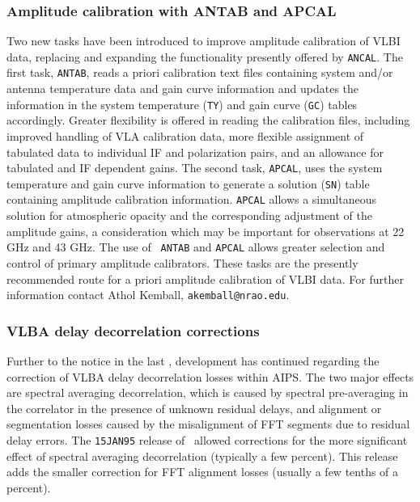 \subsubsection{Amplitude calibration with ANTAB and APCAL}

Two new tasks have been introduced to improve amplitude calibration of
VLBI data, replacing and expanding the functionality presently offered
by \hbox{{\tt ANCAL}}. The first task, {\tt ANTAB}, reads a priori
calibration text files containing system and/or antenna temperature
data and gain curve information and updates the information in the
system temperature ({\tt TY}) and gain curve ({\tt GC}) tables
accordingly.  Greater flexibility is offered in reading the
calibration files, including improved handling of VLA calibration
data, more flexible assignment of tabulated data to individual IF and
polarization pairs, and an allowance for tabulated and IF dependent
gains. The second task, {\tt APCAL}, uses the system temperature and
gain curve information to generate a solution ({\tt SN}) table
containing amplitude calibration information. {\tt APCAL} allows a
simultaneous solution for atmospheric opacity and the corresponding
adjustment of the amplitude gains, a consideration which may be
important for observations at 22 GHz and 43 GHz. The use of {\tt
ANTAB} and {\tt APCAL} allows greater selection and control of primary
amplitude calibrators.  These tasks are the presently recommended
route for a priori amplitude calibration of VLBI data.  For further
information contact Athol Kemball, {\tt akemball@nrao.edu}.
\subsubsection{VLBA delay decorrelation corrections}

Further to the notice in the last \Aipsletter, development has
continued regarding the correction of VLBA delay decorrelation losses
within \hbox{AIPS}. The two major effects are spectral averaging
decorrelation, which is caused by spectral pre-averaging in the
correlator in the presence of unknown residual delays, and alignment
or segmentation losses caused by the misalignment of FFT segments due
to residual delay errors.  The {\tt 15JAN95} release of \AIPS\ allowed
corrections for the more significant effect of spectral averaging
decorrelation (typically a few percent). This release adds the smaller
correction for FFT alignment losses (usually a few tenths of a
percent).

